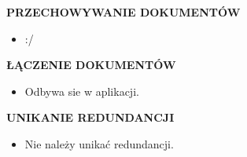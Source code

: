 \documentclass[a5paper,6pt]{article}
\begin{document}
    \textbf{PRZECHOWYWANIE DOKUMENTÓW}
    \begin{itemize}
        \item :/
    \end{itemize}

    \textbf{ŁĄCZENIE DOKUMENTÓW}
    \begin{itemize}
        \item Odbywa sie w aplikacji.
    \end{itemize}

    \textbf{UNIKANIE REDUNDANCJI}
    \begin{itemize}
        \item Nie należy unikać redundancji.
    \end{itemize}


    \newpage
    ~
\end{document}
